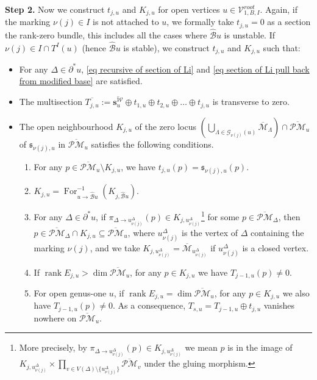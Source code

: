 \documentclass[11pt]{amsart}
\theoremstyle{definition}
\theoremstyle{remark}
\newcommand{\oPMb}{{\overline{\mathcal{PM}}}}
\newcommand{\<}{\left<}
\renewcommand{\>}{\right>}
\numberwithin{equation}{section}
\DeclareMathOperator{\rk}{rank}
\def\Mbar{{\overline{\mathcal M}}}
\begin{document}
\noindent\textbf{Step 2.} 
Now we construct $t_{j,u}$ and $K_{j,u}$ for open vertices $u\in \mathcal V^{root}_{1,B,I}$. Again, if the marking $\nu(j)\in I$ is not attached to $u$, we formally take $t_{j,u}=0$ as a section the rank-zero bundle, this includes all the cases where $\hat{\mathcal B}u$ is unstable. If  $\nu(j)\in I\cap T^I(u)$  (hence $\hat{\mathcal B}u$ is stable), we construct $t_{j,u}$ and $K_{j,u}$ such that:
\begin{itemize}
    \item For any $\Delta \in \partial^* u$, \eqref{eq recursive of section of Li} and \eqref{eq section of Li pull back from modified base} are satisfied.
    \item The multisection $\overline{T_{j,u}}:=\overline{\bm{s}^{\mathcal W}_u} \oplus t_{1,u}\oplus t_{2,u}\oplus\dots \oplus t_{j,u}$ is transverse to zero.
    \item The open neighbourhood $K_{j,u}$  of the zero locus $\left( \bigcup_{\Lambda\in \mathcal G_{\nu(j)}(u)}\Mbar_\Lambda\right)\cap \oPMb_u$ of $\mathfrak{s}_{\nu(j),u}$ in $\oPMb_u$ satisfies the following conditions.
    \begin{enumerate}[label=(\alph*)]
        \item \label{item psi non vanish away from zero locus} 
        For any $p\in\oPMb_u\setminus K_{j,u}$, we have $t_{j,u}(p)=\mathfrak{s}_{\nu(j),u}(p)$.
        
    

        \item $K_{j,u}=\operatorname{For}^{-1}_{u\to \hat{\mathcal B}u}(K_{j,\hat{\mathcal B}u})$.
        
        \item\label{item recursive perturbed area} 
        For any $\Delta \in \partial^* u$, if $\pi_{\Delta \to u^{\Delta}_{\nu(j)}}(p)\in K_{j,u^{\Delta}_{\nu(j)}}$\footnote{More precisely, by $\pi_{\Delta \to u^{\Delta}_{\nu(j)}}(p)\in K_{j,u^{\Delta}_{\nu(j)}}$ we mean $p$ is in the image of $K_{j,u^{\Delta}_{\nu(j)}}\times \prod_{v\in V(\Delta)\setminus \{u^{\Delta}_{\nu(j)}\}}\oPMb_v$ under the gluing morphism.}   for some $p\in \oPMb_{\Delta}$, then $p\in \oPMb_{\Delta}\cap K_{j,u} \subseteq \oPMb_u$, where $u^{\Delta}_{\nu(j)}$ is the vertex of $\Delta$ containing the marking $\nu(j)$, and we take $K_{j,u^{\Delta}_{\nu(j)}}=\Mbar_{u^{\Delta}_{\nu(j)}}$ if $u^{\Delta}_{\nu(j)}$ is a closed vertex.
        \item\label{item remaining part non vanish rk>dim} 
        If $\rk E_{j,u}> \dim \oPMb_u$, for any $p\in K_{j,u}$ we have $ T_{j-1,u}(p) \ne 0$.
        \item\label{item remaining part non vanish rk=dim} For open genus-one $u$, if $\rk E_{j,u}= \dim \oPMb_u$, for any $p\in K_{j,u}$ we also have $ T_{j-1,u}(p) \ne 0$. As a consequence, $T_{s,u}=T_{j-1,u}\oplus t_{j,u}$ vanishes nowhere on $\oPMb_u$.
    \end{enumerate}
    \end{itemize}
   
\end{document}
